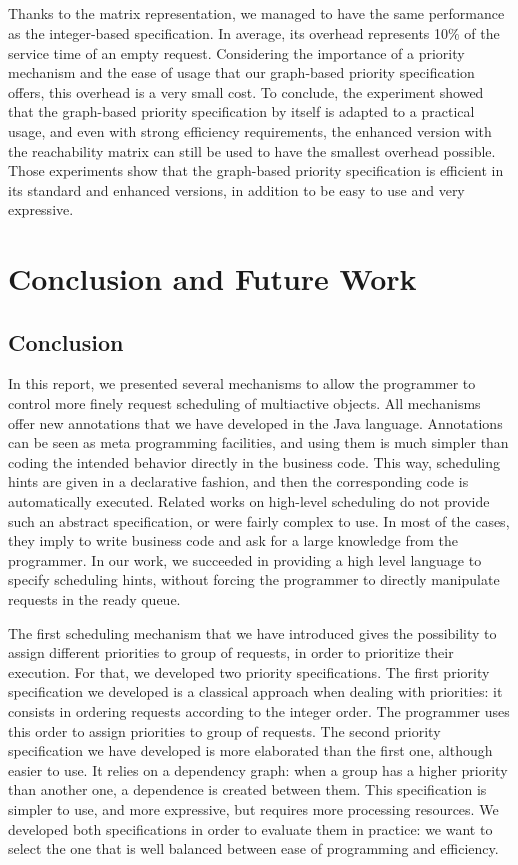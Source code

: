 \documentclass[11pt]{report}
\begin{document}
\paragraph{}
Thanks to the matrix representation, we managed to have the same performance as the integer-based specification. In average, its overhead represents 10\% of the service time of an empty request. Considering the importance of a priority mechanism and the ease of usage that our graph-based priority specification offers, this overhead is a very small cost. 
To conclude, the experiment showed that the graph-based priority specification by itself is adapted to a practical usage, and even with strong efficiency requirements, the enhanced version with the reachability matrix can still be used to have the smallest overhead possible. Those experiments show that the graph-based priority specification is efficient in its standard and enhanced versions, in addition to be easy to use and very expressive. 

\chapter{Conclusion and Future Work} 
\section{Conclusion}
In this report, we presented several mechanisms to allow the programmer to control more finely request scheduling of multiactive objects. All mechanisms offer new annotations that we have developed in the Java language. Annotations can be seen as meta programming facilities, and using them is much simpler than coding the intended behavior directly in the business code. This way, scheduling hints are given in a declarative fashion, and then the corresponding code is automatically executed. Related works on high-level scheduling do not provide such an abstract specification, or were fairly complex to use. In most of the cases, they imply to write business code and ask for a large knowledge from the programmer. In our work, we succeeded in providing a high level language to specify scheduling hints, without forcing the programmer to directly manipulate requests in the ready queue.

The first scheduling mechanism that we have introduced gives the possibility to assign different priorities to group of requests, in order to prioritize their execution. For that, we developed two priority specifications. The first priority specification we developed is a classical approach when dealing with priorities: it consists in ordering requests according to the integer order. The programmer uses this order to assign priorities to group of requests. The second priority specification we have developed is more elaborated than the first one, although easier to use. It relies on a dependency graph: when a group has a higher priority than another one, a dependence is created between them. This specification is simpler to use, and more expressive, but requires more processing resources. We developed both specifications in order to evaluate them in practice: we want to select the one that is well balanced between ease of programming and efficiency.
\end{document}
